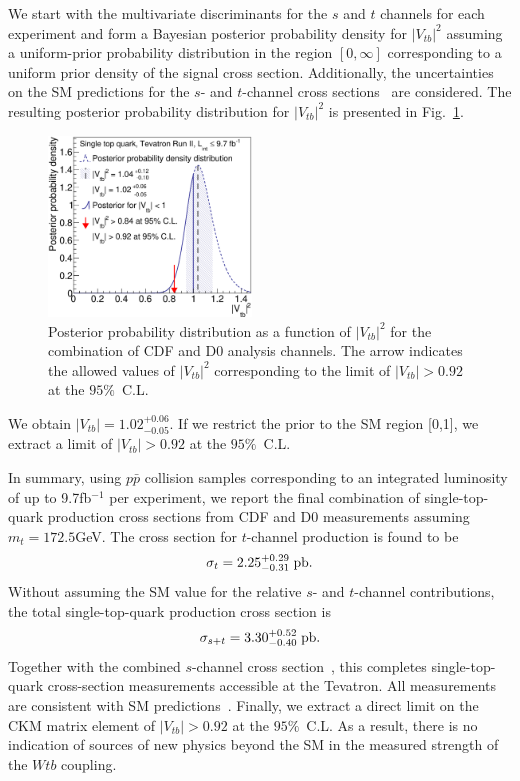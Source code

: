 \documentclass[aps,prl,twocolumn,showpacs,superscriptaddress,groupedaddress]{revtex4}  %
\begin{document}
We start with the multivariate discriminants for the $s$ and $t$
channels for each experiment and form a Bayesian posterior probability
density for $|V_{tb}|^2$ assuming a uniform-prior probability
distribution in the region $[0,\infty]$ corresponding to a uniform
prior density of the signal cross section. Additionally, the
uncertainties on the SM predictions for the $s$- and $t$-channel cross
sections~\cite{schannel-kidonakis,tchannel-kidonakis} are
considered. The resulting posterior probability distribution for
$|V_{tb}|^2$ is presented in Fig.~\ref{fig:TevVtb}. 
%
\begin{figure}[!h!tbp]
\begin{center}
\includegraphics[width=0.48\textwidth]{fig04.eps}
\caption{Posterior probability distribution as a
  function of $|V_{tb}|^2$ for the combination of CDF and D0 analysis
  channels. The arrow indicates the allowed values of $|V_{tb}|^2$
  corresponding to the limit of $|V_{tb}| > 0.92$ at the $95\%$~C.L.} 
\label{fig:TevVtb}
\end{center}
\end{figure}
%
We obtain $|V_{tb}| = 1.02^{+0.06}_{-0.05}$. If we restrict the prior
to the SM region [0,1], we extract a limit of $|V_{tb}| > 0.92$ at the
$95\%$~C.L.  





In summary, using $p\bar{p}$ collision samples corresponding to an
integrated luminosity of up to 9.7\;fb$^{-1}$ per experiment, we
report the final combination of single-top-quark production cross
sections from CDF and D0 measurements assuming $m_t=172.5$\;GeV. The
cross section for $t$-channel production is found to be  
\[\sigma_t = 2.25 ^{+0.29}_{-0.31}\;\rm pb .\] Without assuming the SM
value for the relative $s$- and $t$-channel contributions, the total
single-top-quark production cross section is \[\sigma_{s+t} =
3.30^{+0.52}_{-0.40}\;\rm pb.\] Together with the combined $s$-channel
cross section~\cite{tev_schannel}, this completes single-top-quark
cross-section measurements accessible at the Tevatron. All
measurements are consistent with SM
predictions~\cite{schannel-kidonakis,tchannel-kidonakis}. Finally, we
extract a direct limit on the CKM matrix element of $|V_{tb}| > 0.92$
at the $95\%$~C.L. As a result, there is no indication of sources of
new physics beyond the SM in the measured strength of the $Wtb$
coupling. 
 
\end{document}
